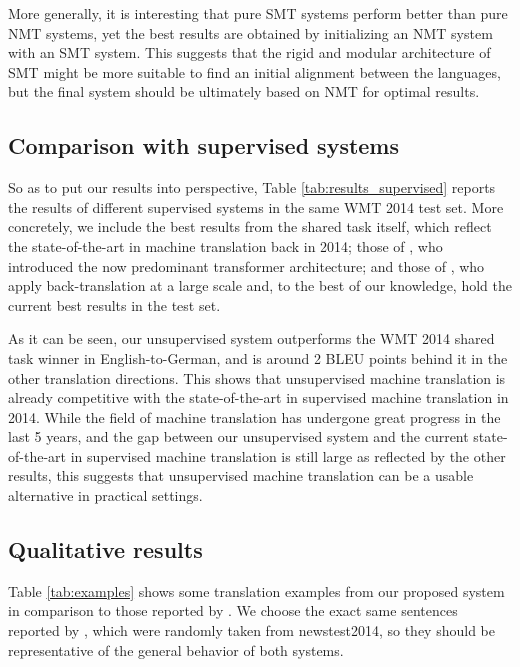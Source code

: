 \documentclass[11pt,a4paper]{article}
\begin{document}
More generally, it is interesting that pure SMT systems perform better than pure NMT systems, yet the best results are obtained by initializing an NMT system with an SMT system. This suggests that the rigid and modular architecture of SMT might be more suitable to find an initial alignment between the languages, but the final system should be ultimately based on NMT for optimal results.


\subsection{Comparison with supervised systems} \label{subsec:results_supervised}

So as to put our results into perspective, Table \ref{tab:results_supervised} reports the results of different supervised systems in the same WMT 2014 test set. More concretely, we include the best results from the shared task itself, which reflect the state-of-the-art in machine translation back in 2014; those of \citet{vaswani2017attention}, who introduced the now predominant transformer architecture; and those of \citet{edunov2018understanding}, who apply back-translation at a large scale and, to the best of our knowledge, hold the current best results in the test set.

As it can be seen, our unsupervised system outperforms the WMT 2014 shared task winner in English-to-German, and is around 2 BLEU points behind it in the other translation directions.
This shows that unsupervised machine translation is already competitive with the state-of-the-art in supervised machine translation in 2014. While the field of machine translation has undergone great progress in the last 5 years, and the gap between our unsupervised system and the current state-of-the-art in supervised machine translation is still large as reflected by the other results, this suggests that unsupervised machine translation can be a usable alternative in practical settings.


\subsection{Qualitative results} \label{subsec:results_examples}

Table \ref{tab:examples} shows some translation examples from our proposed system in comparison to those reported by \citet{artetxe2018usmt}. We choose the exact same sentences reported by \citet{artetxe2018usmt}, which were randomly taken from newstest2014, so they should be representative of the general behavior of both systems.
\end{document}
